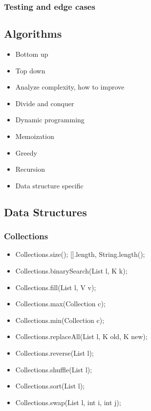 \documentclass{article}
\begin{document}
\subsubsection{Testing and edge cases}

\subsection{Algorithms}
\begin{itemize}
    \item Bottom up
    \item Top down
    \item Analyze complexity, how to improve
    \item Divide and conquer
    \item Dynamic programming
    \item Memoization
    \item Greedy
    \item Recursion
    \item Data structure specific
\end{itemize}

\subsection{Data Structures}
\subsubsection{Collections}
\begin{itemize}
    \item Collections.size(); [].length, String.length();
    \item Collections.binarySearch(List l, K k);
    \item Collections.fill(List l, V v);
    \item Collections.max(Collection c);
    \item Collections.min(Collection c);
    \item Collections.replaceAll(List l, K old, K new);
    \item Collections.reverse(List l);
    \item Collections.shuffle(List l);
    \item Collections.sort(List l);
    \item Collections.swap(List l, int i, int j);
\end{itemize}
\end{document}
